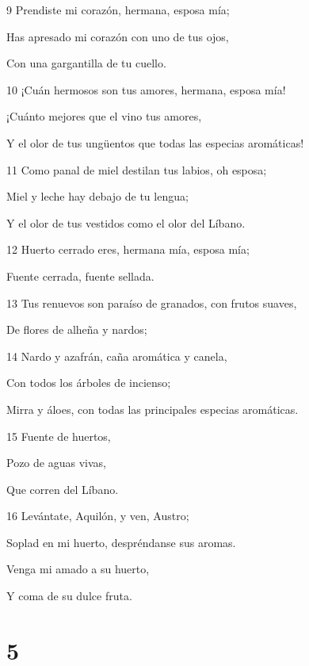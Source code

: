 \par 9 Prendiste mi corazón, hermana, esposa mía;
\par Has apresado mi corazón con uno de tus ojos,
\par Con una gargantilla de tu cuello.
\par 10 ¡Cuán hermosos son tus amores, hermana, esposa mía!
\par ¡Cuánto mejores que el vino tus amores,
\par Y el olor de tus ungüentos que todas las especias aromáticas! 
\par 11 Como panal de miel destilan tus labios, oh esposa;
\par Miel y leche hay debajo de tu lengua;
\par Y el olor de tus vestidos como el olor del Líbano.
\par 12 Huerto cerrado eres, hermana mía, esposa mía;
\par Fuente cerrada, fuente sellada.
\par 13 Tus renuevos son paraíso de granados, con frutos suaves,
\par De flores de alheña y nardos;
\par 14 Nardo y azafrán, caña aromática y canela,
\par Con todos los árboles de incienso;
\par Mirra y áloes, con todas las principales especias aromáticas.
\par 15 Fuente de huertos,
\par Pozo de aguas vivas,
\par Que corren del Líbano.
\par 16 Levántate, Aquilón, y ven, Austro;
\par Soplad en mi huerto, despréndanse sus aromas.
\par Venga mi amado a su huerto,
\par Y coma de su dulce fruta.

\chapter{5}

